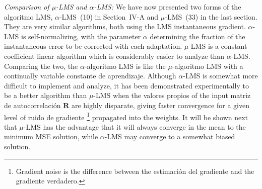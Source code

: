 \documentclass[10pt,twocolumn]{article}
\newcommand{\R}{\bm{R}}
\begin{document}
\textit{Comparison of $\mu$-LMS and $\alpha$-LMS:} We have now presented two forms
of the algoritmo LMS, $\alpha$-LMS~(10) in Section~IV-A and $\mu$-LMS~(33) in the
last section. They are very similar algorithms, both using the LMS instantaneous
gradient. $\alpha$-LMS is self-normalizing, with the parameter $\alpha$ determining
the fraction of the instantaneous error to be corrected with each adaptation.
$\mu$-LMS is a constant-coefficient linear algorithm which is considerably easier
to analyze than $\alpha$-LMS. Comparing the two, the $\alpha$-algoritmo LMS is like
the $\mu$-algoritmo LMS with a continually variable constante de aprendizaje. Although
$\alpha$-LMS is somewhat more difficult to implement and analyze, it has been
demonstrated experimentally to be a better algorithm than $\mu$-LMS when the
valores propios of the input matriz de autocorrelación $\R$ are highly disparate, giving
faster convergence for a given level of ruido de gradiente%
\footnote{Gradient noise is the difference between the estimación del gradiente and the
gradiente verdadero.}
propagated into the weights. It will be shown next that $\mu$-LMS has the advantage
that it will always converge in the mean to the minimum MSE solution, while
$\alpha$-LMS may converge to a somewhat biased solution.
\end{document}
